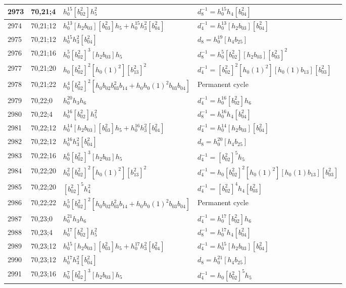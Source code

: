 \documentclass{article}
\begin{document}
\begin{longtable}{|l|l|>{\raggedright\arraybackslash}p{6cm}|>{\raggedright\arraybackslash}p{6cm}|}
\hline
2973 & 70,21;4 & $h_0^{15}[b_{02}^2]h_5^2$ & $d_{8}^{-1}=h_0^{15}h_4[b_{04}^2]$\\
\hline
2974 & 70,21;12 & $h_0^{13}[h_2b_{03}][b_{03}^2]h_5 + h_0^{15}h_3^2[b_{04}^2]$ & $d_{4}^{-1}=h_0^{13}[h_2b_{03}][b_{04}^2]$\\
2975 & 70,21;12 & $h_0^{15}h_3^2[b_{04}^2]$ &$d_{8}=h_0^{19}[h_4b_{25}]$\\
\hline
2976 & 70,21;16 & $h_0^5[b_{02}^2]^3[h_2b_{03}]h_5$ & $d_{8}^{-1}=h_0^5[b_{02}^2][h_2b_{03}][b_{03}^2]^2$\\
\hline
2977 & 70,21;20 & $h_0[b_{02}^2]^2[h_0(1)^2][b_{13}^2]^2$ & $d_{4}^{-1}=[b_{02}^2]^2[h_0(1)^2][h_0(1)b_{13}][b_{03}^2]$\\
\hline
2978 & 70,21;22 & $h_0^4[b_{02}^2]^2[h_0b_{02}b_{03}^2b_{14} + h_0h_0(1)^2b_{03}b_{04}]$ & Permanent cycle\\
\hline
2979 & 70,22;0 & $h_0^{20}h_3h_6$ & $d_{4}^{-1}=h_0^{16}[b_{02}^2]h_6$\\
\hline
2980 & 70,22;4 & $h_0^{16}[b_{02}^2]h_5^2$ & $d_{8}^{-1}=h_0^{16}h_4[b_{04}^2]$\\
\hline
2981 & 70,22;12 & $h_0^{14}[h_2b_{03}][b_{03}^2]h_5 + h_0^{16}h_3^2[b_{04}^2]$ & $d_{4}^{-1}=h_0^{14}[h_2b_{03}][b_{04}^2]$\\
2982 & 70,22;12 & $h_0^{16}h_3^2[b_{04}^2]$ &$d_{8}=h_0^{20}[h_4b_{25}]$\\
\hline
2983 & 70,22;16 & $h_0^6[b_{02}^2]^3[h_2b_{03}]h_5$ & $d_{4}^{-1}=[b_{02}^2]^5h_5$\\
\hline
2984 & 70,22;20 & $h_0^2[b_{02}^2]^2[h_0(1)^2][b_{13}^2]^2$ & $d_{4}^{-1}=h_0[b_{02}^2]^2[h_0(1)^2][h_0(1)b_{13}][b_{03}^2]$\\
2985 & 70,22;20 & $[b_{02}^2]^5h_4^2$ & $d_{4}^{-1}=[b_{02}^2]^4h_4[b_{03}^2]$\\
\hline
2986 & 70,22;22 & $h_0^5[b_{02}^2]^2[h_0b_{02}b_{03}^2b_{14} + h_0h_0(1)^2b_{03}b_{04}]$ & Permanent cycle\\
\hline
2987 & 70,23;0 & $h_0^{21}h_3h_6$ & $d_{4}^{-1}=h_0^{17}[b_{02}^2]h_6$\\
\hline
2988 & 70,23;4 & $h_0^{17}[b_{02}^2]h_5^2$ & $d_{8}^{-1}=h_0^{17}h_4[b_{04}^2]$\\
\hline
2989 & 70,23;12 & $h_0^{15}[h_2b_{03}][b_{03}^2]h_5 + h_0^{17}h_3^2[b_{04}^2]$ & $d_{4}^{-1}=h_0^{15}[h_2b_{03}][b_{04}^2]$\\
2990 & 70,23;12 & $h_0^{17}h_3^2[b_{04}^2]$ &$d_{8}=h_0^{21}[h_4b_{25}]$\\
\hline
2991 & 70,23;16 & $h_0^7[b_{02}^2]^3[h_2b_{03}]h_5$ & $d_{4}^{-1}=h_0[b_{02}^2]^5h_5$\\

\end{longtable}
\end{document}
